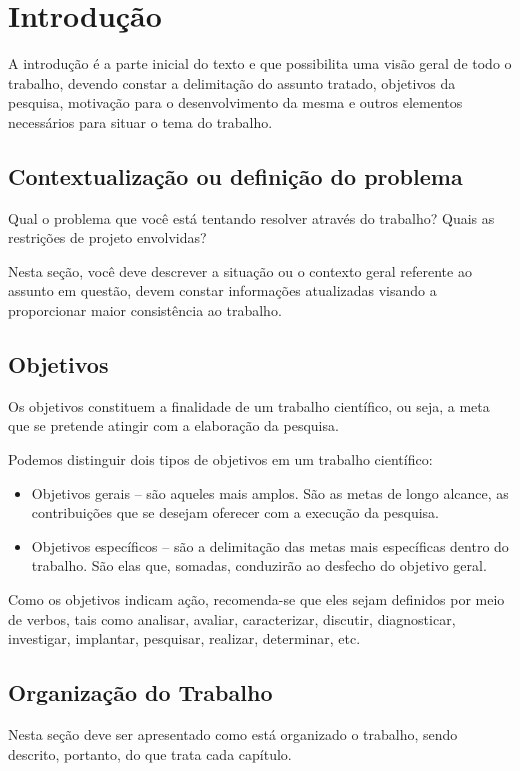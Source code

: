 \chapter{Introdução}
\label{sec:introdução}

\lettrine[lines=3]{A}{} introdução é a parte inicial do texto e que possibilita uma visão geral de todo o trabalho, devendo constar a delimitação do assunto tratado, objetivos da pesquisa, motivação para o desenvolvimento da mesma e outros elementos necessários para situar o tema do trabalho.

	\section{Contextualização ou definição do problema}
	
		Qual o problema que você está tentando resolver através do trabalho? Quais as restrições de projeto envolvidas?

		Nesta seção, você deve descrever a situação ou o contexto geral referente ao assunto em questão, devem constar informações atualizadas visando a proporcionar maior consistência ao trabalho.

	\section{Objetivos}

		Os objetivos constituem a finalidade de um trabalho científico, ou seja, a meta que se pretende atingir com a elaboração da pesquisa.
		
		Podemos distinguir dois tipos de objetivos em um trabalho científico:
		
		\begin{itemize}
			\item Objetivos gerais – são aqueles mais amplos. São as metas de longo alcance, as contribuições que se desejam oferecer com a execução da pesquisa.

			\item Objetivos específicos – são a delimitação das metas mais específicas dentro do trabalho. São elas que, somadas, conduzirão ao desfecho do objetivo geral.
		\end{itemize}
		
		Como os objetivos indicam ação, recomenda-se que eles sejam definidos por meio de verbos, tais como analisar, avaliar, caracterizar, discutir, diagnosticar, investigar, implantar, pesquisar, realizar, determinar, etc.
		
	\section{Organização do Trabalho}
	
		Nesta seção deve ser apresentado como está organizado o trabalho, sendo descrito, portanto, do que trata cada capítulo.


